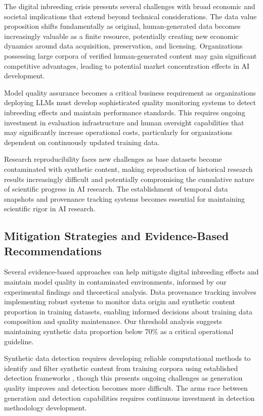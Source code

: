 \documentclass{article}
\begin{document}
The digital inbreeding crisis presents several challenges with broad economic and societal implications that extend beyond technical considerations. The data value proposition shifts fundamentally as original, human-generated data becomes increasingly valuable as a finite resource, potentially creating new economic dynamics around data acquisition, preservation, and licensing. Organizations possessing large corpora of verified human-generated content may gain significant competitive advantages, leading to potential market concentration effects in AI development.

Model quality assurance becomes a critical business requirement as organizations deploying LLMs must develop sophisticated quality monitoring systems to detect inbreeding effects and maintain performance standards. This requires ongoing investment in evaluation infrastructure and human oversight capabilities that may significantly increase operational costs, particularly for organizations dependent on continuously updated training data.

Research reproducibility faces new challenges as base datasets become contaminated with synthetic content, making reproduction of historical research results increasingly difficult and potentially compromising the cumulative nature of scientific progress in AI research. The establishment of temporal data snapshots and provenance tracking systems becomes essential for maintaining scientific rigor in AI research.

\subsection{Mitigation Strategies and Evidence-Based Recommendations}

Several evidence-based approaches can help mitigate digital inbreeding effects and maintain model quality in contaminated environments, informed by our experimental findings and theoretical analysis. Data provenance tracking involves implementing robust systems to monitor data origin and synthetic content proportion in training datasets, enabling informed decisions about training data composition and quality maintenance. Our threshold analysis suggests maintaining synthetic data proportion below 70\% as a critical operational guideline.

Synthetic data detection requires developing reliable computational methods to identify and filter synthetic content from training corpora using established detection frameworks \cite{mitchell2023detectgpt}, though this presents ongoing challenges as generation quality improves and detection becomes more difficult. The arms race between generation and detection capabilities requires continuous investment in detection methodology development.
\end{document}

